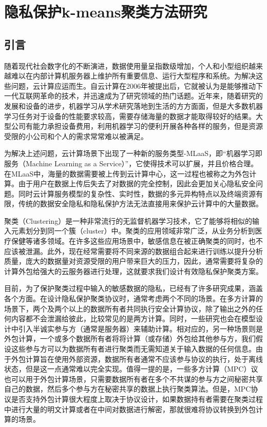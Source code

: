 \chapter{隐私保护k-means聚类方法研究}

\section{引言}
随着现代社会数字化的不断演进，数据使用量呈指数级增加，个人和小型组织越来越难以在内部计算机服务器上维护所有重要信息、运行大型程序和系统。为解决这些问题，云计算应运而生。自云计算在2006年被提出后，它就被认为是能够推动下一代互联网革命的技术，并迅速成为了研究领域的热门话题\cite{sadiku2014cloud}。近年来，随着研究的发展和设备的进步，机器学习从学术研究落地到生活的方方面面，但是大多数机器学习任务对于设备的性能要求较高，需要存储海量的数据才能取得较好的结果。大型公司有能力承担设备费用，利用机器学习的便利开展各种各样的服务，但是资源受限的小公司和个人的需求常常难以被满足。

为解决上述问题，云计算场景下出现了一种新的服务类型-MLaaS，即“机器学习即服务（Machine Learning as a Service）”，它使得技术可以扩展，并且价格合理\cite{ribeiro2015mlaas}。在MLaaS中，海量的数据需要被上传到云计算中心，这一过程也被称之为外包计算。由于用户在数据上传后失去了对数据的完全控制，因此会更加关心隐私安全问题。同时云计算服务模型的复杂性、实时性，数据的多元异构特点以及终端资源有限，传统的数据安全隐私和隐私保护方法无法直接用来保护云计算中的大量数据\cite{hunt2018chiron}。

聚类（Clustering）是一种非常流行的无监督机器学习技术，它了能够将相似的输入元素划分到同一个簇（cluster）中。聚类的应用领域非常广泛，从业务分析到医疗保健等诸多领域。在许多这些应用场景中，敏感信息在被正确聚类的同时，也不应该被泄漏。此外，现在经常需要将不同来源的数据组合起来进行训练以提升分析质量，庞大的数据量对资源受限的用户带来巨大的压力，因此，通常需要将复杂的计算外包给强大的云服务器进行处理，这就要求我们设计有效隐私保护聚类方案\cite{ahmed2020k}。

目前，为了保护聚类过程中输入的敏感数据的隐私，已经有了许多研究成果，涵盖各个方面。在设计隐私保护聚类协议时，通常考虑两个不同的场景。在多方计算的场景下\cite{cramer2015secure}，两个及两个以上的数据所有者共同执行安全计算协议，除了输出之外的任何内容都不会泄漏给彼此，比较常见的是两方计算。同时，一些研究也会在模型设计中引入半诚实参与方（通常是服务器）来辅助计算。相对应的，另一种场景则是外包计算\cite{li2018privacy}，一个或多个数据所有者将将计算（或存储）外包给其他参与方，我们假设这些参与方可以为数据所有者进行聚类而无需知道关于输入数据的任何信息。由于外包计算旨在使用外部资源，数据所有者通常不应该参与协议的执行，处于离线状态，但是这一点通常难以完全实现。值得一提的是，一些多方计算（MPC）议也可以用于外包计算场景，只需要数据所有者在多个不共谋的参与方之间秘密共享自己的数据，然后多个参与方在秘密共享的数据上执行聚类算法。但是，MPC协议是否支持外包计算很大程度上取决于协议设计，如果数据持有者需要在聚类过程中进行大量的明文计算或者在中间对数据进行解密，那就很难将协议转换到外包计算的场景。

